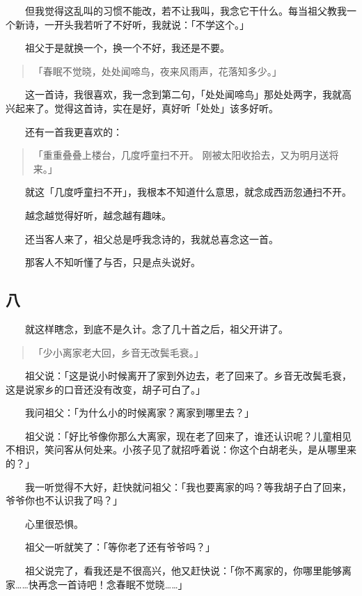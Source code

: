 \documentclass[UTF8]{ctexart}
\begin{document}
　　但我觉得这乱叫的习惯不能改，若不让我叫，我念它干什么。每当祖父教我一个新诗，一开头我若听了不好听，我就说：「不学这个。」

　　祖父于是就换一个，换一个不好，我还是不要。

\begin{verse}
    「春眠不觉晓，处处闻啼鸟，夜来风雨声，花落知多少。」
\end{verse}


　　这一首诗，我很喜欢，我一念到第二句，「处处闻啼鸟」那处处两字，我就高兴起来了。觉得这首诗，实在是好，真好听「处处」该多好听。

　　还有一首我更喜欢的：

\begin{verse}
    「重重叠叠上楼台，几度呼童扫不开。
    刚被太阳收拾去，又为明月送将来。」
\end{verse}

　　就这「几度呼童扫不开」，我根本不知道什么意思，就念成西沥忽通扫不开。

　　越念越觉得好听，越念越有趣味。

　　还当客人来了，祖父总是呼我念诗的，我就总喜念这一首。

　　那客人不知听懂了与否，只是点头说好。

\subsection{八}

　　就这样瞎念，到底不是久计。念了几十首之后，祖父开讲了。

\begin{verse}
    「少小离家老大回，乡音无改鬓毛衰。」
\end{verse}

　　祖父说：「这是说小时候离开了家到外边去，老了回来了。乡音无改鬓毛衰，这是说家乡的口音还没有改变，胡子可白了。」

　　我问祖父：「为什么小的时候离家？离家到哪里去？」

　　祖父说：「好比爷像你那么大离家，现在老了回来了，谁还认识呢？儿童相见不相识，笑问客从何处来。小孩子见了就招呼着说：你这个白胡老头，是从哪里来的？」

　　我一听觉得不大好，赶快就问祖父：「我也要离家的吗？等我胡子白了回来，爷爷你也不认识我了吗？」

　　心里很恐惧。

　　祖父一听就笑了：「等你老了还有爷爷吗？」

　　祖父说完了，看我还是不很高兴，他又赶快说：「你不离家的，你哪里能够离家……快再念一首诗吧！念春眠不觉晓……」
\end{document}
